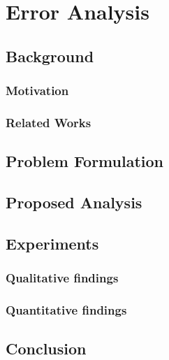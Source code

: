 \chapter{Error Analysis}
\section{Background}
\subsection{Motivation}

\subsection{Related Works}

\section{Problem Formulation}

\section{Proposed Analysis}

\section{Experiments}

\subsection{Qualitative findings}

\subsection{Quantitative findings}

\section{Conclusion}